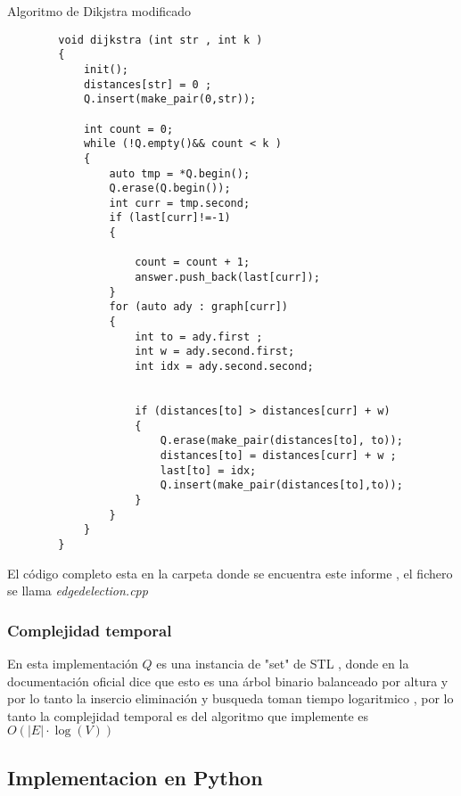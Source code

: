 \documentclass[10pt]{article}
\begin{document}
    \noindent Algoritmo de  Dikjstra modificado 

    \begin{verbatim}
        void dijkstra (int str , int k ) 
        {
            init(); 
            distances[str] = 0 ; 
            Q.insert(make_pair(0,str)); 

            int count = 0; 
            while (!Q.empty()&& count < k ) 
            {
                auto tmp = *Q.begin(); 
                Q.erase(Q.begin());
                int curr = tmp.second;
                if (last[curr]!=-1)
                {
                    
                    count = count + 1;
                    answer.push_back(last[curr]); 
                }
                for (auto ady : graph[curr])
                {
                    int to = ady.first ; 
                    int w = ady.second.first;
                    int idx = ady.second.second; 

                    
                    if (distances[to] > distances[curr] + w)
                    {
                        Q.erase(make_pair(distances[to], to));
                        distances[to] = distances[curr] + w ; 
                        last[to] = idx; 
                        Q.insert(make_pair(distances[to],to));
                    } 
                }
            }
        }
    \end{verbatim}

    \noindent El c\'odigo completo esta en la carpeta donde se encuentra este informe , el fichero se llama \textit{edgedelection.cpp}

    \subsubsection{Complejidad temporal} 

    \noindent En esta implementaci\'on $Q$ es una instancia de "set" de STL , donde en la documentaci\'on oficial dice que esto es una \'arbol binario balanceado por altura y por lo tanto la insercio eliminaci\'on y busqueda toman tiempo logaritmico , por lo tanto la complejidad temporal es del algoritmo que implemente es $O\left(\vert E \vert \cdot \log \left(V\right)\right)$  

    \subsection{Implementacion en Python } 
\end{document}
